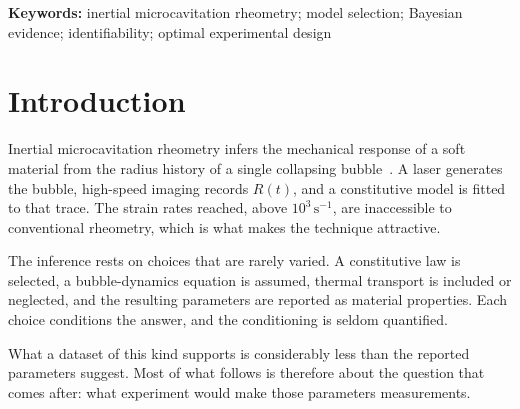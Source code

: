 \documentclass[10pt]{article}
\begin{document}
\begin{abstract}
The second half of the paper asks what experiment would identify the curve rather than absorb
it. Posing the design problem over measures makes it convex and lets the Kiefer--Wolfowitz
equivalence theorem certify the answer instead of reporting that a search stopped, with four
extensions that keep the certificate. Its own numbers rank the variable everyone optimises,
the geometry, last: the split between bubbles and frames is worth $+3.4$ to $+4.0$ nats against
at most $1.34$ for the geometry. Fisher widths from that machinery, corrected for the effective
sample size these records carry, predict the measured per-event parameter scatter to a median
ratio of $0.70$, which is the first test of the design half against data.

Two limits belong with the central claim. Every record comes from one instrument and one
laboratory, so the invariance is established across chemistry and not across apparatus. And a
shared residual from a shared model is what model-form error should look like, but it cannot be
told apart from a shape imprinted by shared processing without a second pipeline. Both are
testable by anyone with another rig.
\end{abstract}

\noindent\textbf{Keywords:} inertial microcavitation rheometry; model selection; Bayesian evidence; identifiability; optimal experimental design

\section{Introduction}

Inertial microcavitation rheometry infers the mechanical response of a soft material from the
radius history of a single collapsing bubble~\citep{estrada2018high}. A laser generates the
bubble, high-speed imaging records $R(t)$, and a constitutive model is fitted to that
trace. The strain rates reached, above $10^{3}\,\mathrm{s}^{-1}$, are inaccessible to
conventional rheometry, which is what makes the technique attractive.

The inference rests on choices that are rarely varied. A constitutive law is selected, a
bubble-dynamics equation is assumed, thermal transport is included or neglected, and the
resulting parameters are reported as material properties. Each choice conditions the answer,
and the conditioning is seldom quantified.

What a dataset of this kind supports is considerably less than the reported parameters suggest.
Most of what follows is therefore about the question that comes after: what experiment would make
those parameters measurements.
\end{document}
